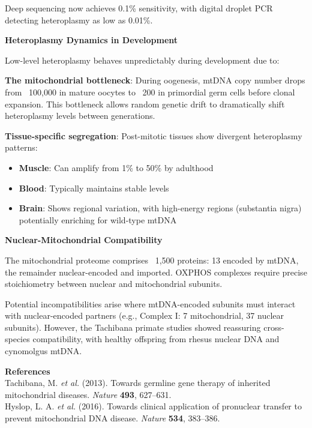 \begin{technical}
Deep sequencing now achieves 0.1\% sensitivity, with digital droplet PCR detecting heteroplasmy as low as 0.01\%.

\noindent\textbf{Heteroplasmy Dynamics in Development}

Low-level heteroplasmy behaves unpredictably during development due to:

\textbf{The mitochondrial bottleneck}: During oogenesis, mtDNA copy number drops from ~100,000 in mature oocytes to ~200 in primordial germ cells before clonal expansion. This bottleneck allows random genetic drift to dramatically shift heteroplasmy levels between generations.

\textbf{Tissue-specific segregation}: Post-mitotic tissues show divergent heteroplasmy patterns:
\begin{itemize}[leftmargin=*]
\item \textbf{Muscle}: Can amplify from 1\% to 50\% by adulthood
\item \textbf{Blood}: Typically maintains stable levels
\item \textbf{Brain}: Shows regional variation, with high-energy regions (substantia nigra) potentially enriching for wild-type mtDNA
\end{itemize}


\noindent\textbf{Nuclear-Mitochondrial Compatibility}

The mitochondrial proteome comprises ~1,500 proteins: 13 encoded by mtDNA, the remainder nuclear-encoded and imported. OXPHOS complexes require precise stoichiometry between nuclear and mitochondrial subunits.

Potential incompatibilities arise where mtDNA-encoded subunits must interact with nuclear-encoded partners (e.g., Complex I: 7 mitochondrial, 37 nuclear subunits). However, the Tachibana primate studies showed reassuring cross-species compatibility, with healthy offspring from rhesus nuclear DNA and cynomolgus mtDNA.

\vspace{0.5em}
\noindent\textbf{References}\\
Tachibana, M. \textit{et al.} (2013). Towards germline gene therapy of inherited mitochondrial diseases. \textit{Nature} \textbf{493}, 627–631.\\
Hyslop, L. A. \textit{et al.} (2016). Towards clinical application of pronuclear transfer to prevent mitochondrial DNA disease. \textit{Nature} \textbf{534}, 383–386.
\end{technical}
